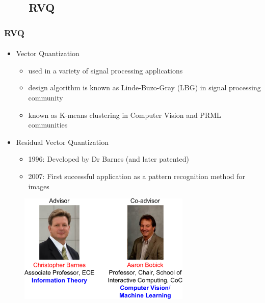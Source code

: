 \subsection{\ \ \ \ RVQ}

\begin{frame}
\frametitle{RVQ}
\framesubtitle{}
\mypagenum{}
\vspace{0.2in}
\begin{itemize}\scriptsize
\item {\color{red}Vector Quantization}
\begin{itemize}\scriptsize
\item used in a variety of signal processing applications
\item design algorithm is known as Linde-Buzo-Gray (LBG) in signal processing community
\item known as K-means clustering in Computer Vision and PRML communities
\end{itemize}
\item {\color{red}Residual Vector Quantization}
\begin{itemize}\scriptsize
\item 1996: Developed by Dr Barnes (and later patented)
\item 2007: First successful application as a pattern recognition method for images
\end{itemize}
\end{itemize}
\begin{figure}
\includegraphics[width=0.73\textwidth]{figs/professors.pdf}
\end{figure}
\end{frame}


